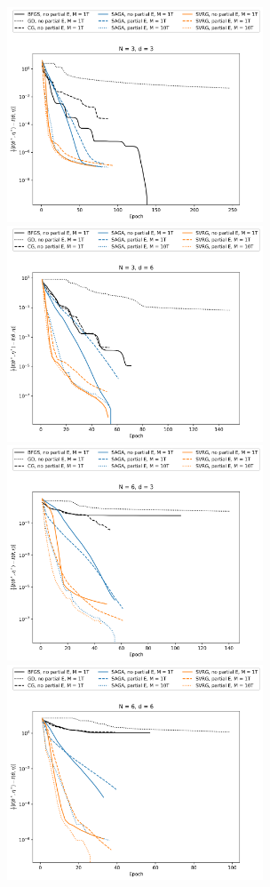 \begin{figure}
    \centering
    \includegraphics[width=3in]{../plt/log-like_v_epoch_T-100000-K-3-1-d-3-003.png}
    \includegraphics[width=3in]{../plt/log-like_v_epoch_T-100000-K-3-1-d-6-003.png}
    \\
    \includegraphics[width=3in]{../plt/log-like_v_epoch_T-100000-K-6-1-d-3-003.png}
    \includegraphics[width=3in]{../plt/log-like_v_epoch_T-100000-K-6-1-d-6-003.png}   

\end{figure}

